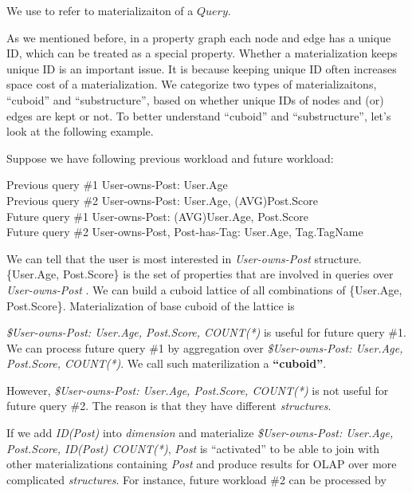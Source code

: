 We use  to refer to materializaiton of a $Query$.

As we mentioned before, in a property graph each node and edge has a unique ID, which can be treated as a special property. Whether a materialization keeps unique ID is an important issue. It is because keeping unique ID often increases space cost of a materialization. We categorize two types of materializaitons, ``cuboid'' and ``substructure'', based on whether unique IDs of nodes and (or) edges are kept or not. To better understand ``cuboid'' and ``substructure'', let's look at the following example.


Suppose we have following previous workload and future workload:

\noindent Previous query \#1 User-owns-Post: User.Age\\
Previous query \#2 User-owns-Post: User.Age, (AVG)Post.Score\\
Future query \#1 User-owns-Post: (AVG)User.Age, Post.Score	\\
Future query \#2 User-owns-Post, Post-has-Tag: User.Age, Tag.TagName




%
%

We can tell that the user is most interested in  \textit{User-owns-Post} structure. \{User.Age, Post.Score\} is the set of properties that are involved in queries over \textit{User-owns-Post} . We can build a cuboid lattice of all combinations of  \{User.Age, Post.Score\}. Materialization of base cuboid of the lattice is


\textit{\$User-owns-Post: User.Age, Post.Score, COUNT(*)} is useful for future query \#1. We can process future query \#1 by aggregation over \textit{\$User-owns-Post: User.Age, Post.Score, COUNT(*)}. We call such materilization a \textbf{``cuboid''}.


However, \textit{\$User-owns-Post: User.Age, Post.Score, COUNT(*)} is not useful for future query \#2. The reason is that they have different \textit{structures}.


If we add \textit{ID(Post)} into \textit{dimension} and materialize \textit{\$User-owns-Post: User.Age, Post.Score, ID(Post) COUNT(*)}, \textit{Post} is ``activated'' to be able to join with other materializations containing \textit{Post} and produce results for OLAP over more complicated \textit{structures}. For instance, future workload \#2 can be processed by 


